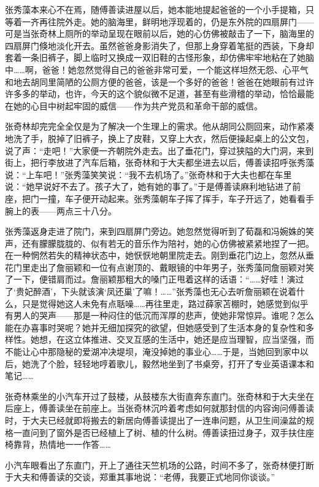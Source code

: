 \par 张秀藻本来心不在焉，随傅善读进屋以后，她本能地提起爸爸的一个小手提箱，只等着一齐再往院外走。她的脑海里，鲜明地浮现着的，仍是东外院的四扇屏门——可是当张奇林上厕所的举动呈现在眼前以后，她的心仿佛被敲击了一下，脑海里的四扇屏门倏地淡化开去。虽然爸爸身影消失了，但那上身穿着笔挺的西装，下身却套着一条旧裤子，脚上临时又换成一双旧鞋的古怪形象，却仿佛牢牢地粘在了她脑中……啊，爸爸！她忽然觉得自己的爸爸非常可爱，一个能这样坦然无怨、心平气和地去胡同里简陋的公厕方便的爸爸，该是一个多好的爸爸！爸爸在她眼前有过许许多多的举动，也许，今天的这个貌似微不足道，甚至有些滑稽的举动，恰恰最能在她的心目中树起牢固的威信——作为共产党员和革命干部的威信。
\par 张奇林却完完全全仅是为了解决一个生理上的需求。他从胡同公厕回来，动作紧凑地洗了手，脱掉了旧裤子，换上了皮鞋，又穿上大衣，然后便操起桌上的公文包，说了声：“走吧！”大家便一齐朝院外走去。出了垂花门，穿过狭隘的大门洞，来到街上，把行李放进了汽车后箱，张奇林和于大夫都坐进去以后，傅善读招呼张秀藻说：“上车吧！”张秀藻笑笑说：“我不去机场了。”张奇林和于大夫也都在车里说：“她早说好不去了。孩子大了，她有她的事了。”于是傅善读麻利地钻进了前座，把门一撞，车子便开动起来。张秀藻朝车子挥了挥手，车子开远了，她看看手腕上的表——两点三十八分。
\par 张秀藻返身走进了院门，来到四扇屏门旁边。她忽然觉得听到了荀磊和冯婉姝的笑声，还有朦朦胧胧的、似有若无的音乐作为陪衬，她的心仿佛被紧紧地捏了一把。在一种惘然若失的精神状态中，她恹恹地朝里院走去。刚到垂花门边上，忽然从垂花门里走出了詹丽颖和一位有点谢顶的、戴眼镜的中年男子，张秀藻同詹丽颖对笑了一下，便错肩而过。詹丽颖那粗大的嗓门正甩着这样的话语：“……好哇！演过了‘贵妃醉酒’，下头就该演‘凤还巢’了嘛！……”张秀藻也无心去听詹丽颖在说着什么，只是觉得她这人未免有点聒噪……再往里走，路过薛家苫棚时，她感觉到似乎有男人的哭声——那是一种闷住的低沉而浑厚的悲声，使她非常惊异。谁呢？怎么能在办喜事时哭呢？她并无细加探究的欲望，但她感受到了生活本身的复杂性和多样性。她想，在这立体推进、交叉互感的生活中，她还是应当理智，应当坚强，而不能让心中那隐秘的爱湖冲决堤坝，淹没掉她的事业心……于是，当她回到家中以后，她洗了个脸，轻轻地哼着歌儿，毅然地坐到了书桌旁，打开了专业英语课本和笔记……
\par 张奇林乘坐的小汽车开过了鼓楼，从鼓楼东大街直奔东直门。张奇林和于大夫坐在后座上，傅善读坐在前座上。当张奇林沉吟着考虑如何就那封信的内容询问傅善读时，于大夫已经就即将搬去的新居向傅善读提出了一连串问题，从卫生间澡盆的规格一直问到了窗外是否已经植上了树、植的什么树。傅善读扭过身子，双手扶住座椅靠背，热情地一一作答……
\par 小汽车眼看出了东直门，开上了通往天竺机场的公路，时间不多了，张奇林便打断于大夫和傅善读的交谈，郑重其事地说：“老傅，我要正式地同你谈谈。”
